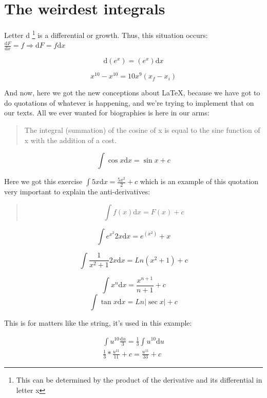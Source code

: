 \documentclass{article}
\begin{document}
\section*{The weirdest integrals}

\noindent Letter d \footnote{This can be determined by the product of the
derivative and its differential in letter x} is a differential or growth. Thus,
this situation occurs:
$ \frac{\mathrm{d}F}{\mathrm{d}x} = f \Rightarrow \mathrm{d}F = f\mathrm{d}x $

\[ \mathrm{d}(e^x) = (e^x)\mathrm{d}x \]

\[ x^{10} - x^{10} = 10x^9(x_f - x_i) \]

\noindent And now, here we got the new conceptions about \LaTeX, because we have
got to do quotations of whatever is happening, and we're trying to implement
that on our texts. All we ever wanted for biographies is here in our arms:

\begin{quote}
The integral (summation) of the cosine of x is equal to the sine function of x
with the addition of a cost.
\end{quote}

\[ \int \cos  x \mathrm{d}x = \sin  x + c \]

\noindent Here we got this exercise
$ \int 5x \mathrm{d}x = \frac{5x^2}{2} + c $ which is an example of this
quotation very important to explain the anti-derivatives:

\begin{quote}
\[ \int f(x) \mathrm{d}x = F(x) + c \]
\end{quote}


\[ \int e^{x^2}2x \mathrm{d}x = e^(x^2) + x \]

\[ \int \frac{1}{x^2 + 1}2x \mathrm{d}x = Ln(x^2 + 1) + c \]

\[ \int x^n \mathrm{d}x = \frac{x^{n + 1}}{n + 1} + c \]
\[ \int \tan x \mathrm{d}x = Ln|\sec x| + c \]

\noindent This is for matters like the string, it's used in this example:

\begin{gather*}
\int u^{10} \frac{\mathrm{d}u}{3} = \frac{1}{3} \int u^{10} \mathrm{d}u \\
\frac{1}{3}*\frac{u^{11}}{11}+c = \frac{u^{11}}{33}+c
\end{gather*}
\end{document}
